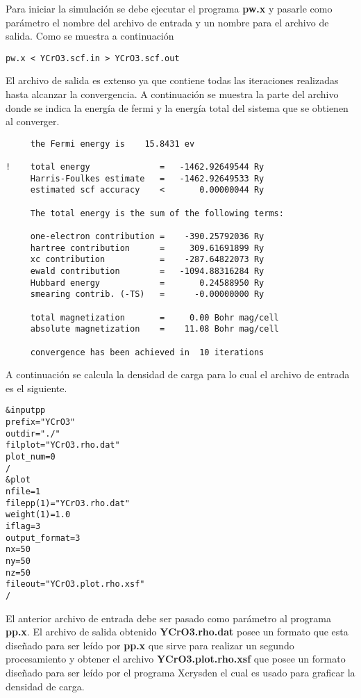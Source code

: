 \noindent Para iniciar la simulaci\'on se debe ejecutar el programa \textbf{pw.x} y pasarle como par\'ametro el nombre del archivo de entrada y un nombre para el archivo de salida. Como se muestra a continuaci\'on

\begin{lstlisting}
pw.x < YCrO3.scf.in > YCrO3.scf.out
\end{lstlisting}

\noindent El archivo de salida es extenso ya que contiene todas las iteraciones realizadas hasta alcanzar la convergencia. A continuaci\'on se muestra la parte del archivo donde se indica la energ\'ia de fermi y la energ\'ia total del sistema que se obtienen al converger.

\begin{lstlisting}
     the Fermi energy is    15.8431 ev

!    total energy              =   -1462.92649544 Ry
     Harris-Foulkes estimate   =   -1462.92649533 Ry
     estimated scf accuracy    <       0.00000044 Ry

     The total energy is the sum of the following terms:

     one-electron contribution =    -390.25792036 Ry
     hartree contribution      =     309.61691899 Ry
     xc contribution           =    -287.64822073 Ry
     ewald contribution        =   -1094.88316284 Ry
     Hubbard energy            =       0.24588950 Ry
     smearing contrib. (-TS)   =      -0.00000000 Ry

     total magnetization       =     0.00 Bohr mag/cell
     absolute magnetization    =    11.08 Bohr mag/cell

     convergence has been achieved in  10 iterations
\end{lstlisting}

\noindent A continuaci\'on se calcula la densidad de carga para lo cual el archivo de entrada es el siguiente.

\begin{lstlisting}
&inputpp
prefix="YCrO3"
outdir="./"
filplot="YCrO3.rho.dat"
plot_num=0
/
&plot
nfile=1
filepp(1)="YCrO3.rho.dat"
weight(1)=1.0
iflag=3
output_format=3
nx=50
ny=50
nz=50
fileout="YCrO3.plot.rho.xsf"
/
\end{lstlisting}

\noindent El anterior archivo de entrada debe ser pasado como par\'ametro al programa \textbf{pp.x}. El archivo de salida obtenido \textbf{YCrO3.rho.dat} posee un formato que esta dise\~nado para ser le\'ido por \textbf{pp.x} que sirve para realizar un segundo procesamiento y obtener el archivo \textbf{YCrO3.plot.rho.xsf} que posee un formato dise\~nado para ser le\'ido por el programa Xcrysden el cual es usado para graficar la densidad de carga.

